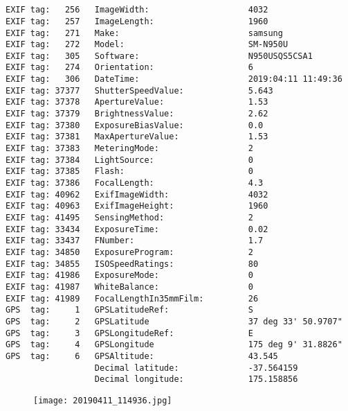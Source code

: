 \section{\protect{}}
\noindent 
\noindent
\begin{lstlisting}
EXIF tag:   256   ImageWidth:                    4032
EXIF tag:   257   ImageLength:                   1960
EXIF tag:   271   Make:                          samsung
EXIF tag:   272   Model:                         SM-N950U
EXIF tag:   305   Software:                      N950USQS5CSA1
EXIF tag:   274   Orientation:                   6
EXIF tag:   306   DateTime:                      2019:04:11 11:49:36
EXIF tag: 37377   ShutterSpeedValue:             5.643
EXIF tag: 37378   ApertureValue:                 1.53
EXIF tag: 37379   BrightnessValue:               2.62
EXIF tag: 37380   ExposureBiasValue:             0.0
EXIF tag: 37381   MaxApertureValue:              1.53
EXIF tag: 37383   MeteringMode:                  2
EXIF tag: 37384   LightSource:                   0
EXIF tag: 37385   Flash:                         0
EXIF tag: 37386   FocalLength:                   4.3
EXIF tag: 40962   ExifImageWidth:                4032
EXIF tag: 40963   ExifImageHeight:               1960
EXIF tag: 41495   SensingMethod:                 2
EXIF tag: 33434   ExposureTime:                  0.02
EXIF tag: 33437   FNumber:                       1.7
EXIF tag: 34850   ExposureProgram:               2
EXIF tag: 34855   ISOSpeedRatings:               80
EXIF tag: 41986   ExposureMode:                  0
EXIF tag: 41987   WhiteBalance:                  0
EXIF tag: 41989   FocalLengthIn35mmFilm:         26
GPS  tag:     1   GPSLatitudeRef:                S
GPS  tag:     2   GPSLatitude                    37 deg 33' 50.9707"
GPS  tag:     3   GPSLongitudeRef:               E
GPS  tag:     4   GPSLongitude                   175 deg 9' 31.8826"
GPS  tag:     6   GPSAltitude:                   43.545
                  Decimal latitude:              -37.564159
                  Decimal longitude:             175.158856

\end{lstlisting}
\clearpage
\begin{figure}
\raggedleft
\texttt{[image: 20190411\_114936.jpg]}
\end{figure}


\clearpage
